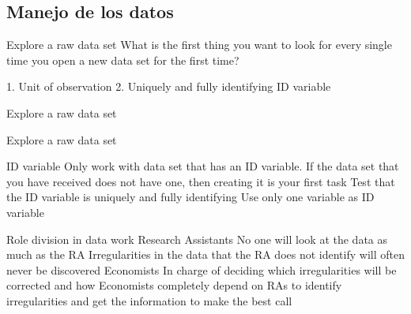\documentclass[11pt, aspectratio=169, compress]{beamer}
\begin{document}
\subsection{Manejo de los datos}
\begin{frame}{Explore a raw data set}
	What is the first thing you want to look for every single time you open a new data set for the first time?

	1. Unit of observation
	2. Uniquely and fully identifying ID variable
\end{frame}
\begin{frame}{Explore a raw data set}
	
\end{frame}
\begin{frame}{Explore a raw data set}
	
\end{frame}
\begin{frame}{ID variable}
	Only work with data set that has an ID variable. If the data set that you have received does not have one, then creating it is your first task 
	Test that the ID variable is uniquely and fully identifying
	Use only one variable as ID variable
\end{frame}
\begin{frame}{Role division in data work}
	Research Assistants
	No one will look at the data as much as the RA
	Irregularities in the data that the RA does not identify will often never be discovered
	Economists
	In charge of deciding which irregularities will be corrected and how
	Economists completely depend on RAs to identify irregularities and get the information to make the best call
\end{frame}
\end{document}
